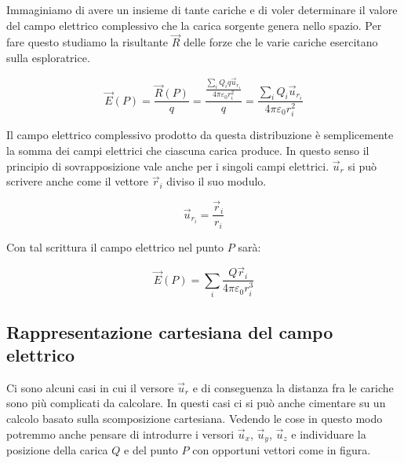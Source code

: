 Immaginiamo di avere un insieme di tante cariche e di voler determinare il valore del campo elettrico complessivo che la carica sorgente genera nello spazio. Per fare questo studiamo la risultante $\vec{R}$ delle forze che le varie cariche esercitano sulla esploratrice.

\[
	\vec{E} (P) = \frac{\vec{R} (P)}{q} = \frac{ \frac{\sum_i Q_i q \vec{u}_{r_i}}{4\pi \varepsilon_0 r_i^2}}{q} =  \frac{\sum_i Q_i \vec{u}_{r_i}}{4\pi \varepsilon_0 r_i^2}
\]

Il campo elettrico complessivo prodotto da questa distribuzione è semplicemente la somma dei campi elettrici che ciascuna carica produce. In questo senso il principio di sovrapposizione vale anche per i singoli campi elettrici. $\vec{u}_r$ si può scrivere anche come il vettore $\vec{r}_i$ diviso il suo modulo.

\[
	\vec{u}_{r_i} = \frac{\vec{r}_i}{r_i}
\]

Con tal scrittura il campo elettrico nel punto $P$ sarà:

\[
	\vec{E} (P) = \sum_i \frac{Q\vec{r}_i}{4\pi \varepsilon_0 r_i^3}
\]

\subsection{Rappresentazione cartesiana del campo elettrico}

Ci sono alcuni casi in cui il versore $\vec{u}_r$ e di conseguenza la distanza fra le cariche sono più complicati da calcolare. In questi casi ci si può anche cimentare su un calcolo basato sulla scomposizione cartesiana.
Vedendo le cose in questo modo potremmo anche pensare di introdurre i versori $\vec{u}_x$, $\vec{u}_y$, $\vec{u}_z$ e individuare la posizione della carica $Q$ e del punto $P$ con opportuni vettori come in figura.

